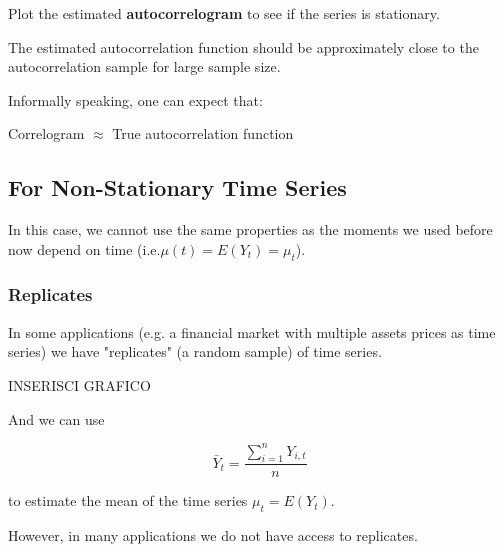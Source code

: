         Plot the estimated \textbf{autocorrelogram} to see if the series is stationary.

        \begin{figure}
        \end{figure}

        The estimated autocorrelation function should be approximately close to the autocorrelation sample for large sample size.

        \begin{proposition}
            Informally speaking, one can expect that:

            Correlogram \(\approx\) True autocorrelation function
        \end{proposition}

    \subsection{For Non-Stationary Time Series}

        In this case, we cannot use the same properties as the moments we used before now depend on time (i.e.\(\mu(t) = E(Y_t) = \mu_t\)).

        \subsubsection{Replicates}

            In some applications (e.g. a financial market with multiple assets prices as time series) we have "replicates" (a random sample) of time series.
            
            INSERISCI GRAFICO

            And we can use

            \begin{equation}
                \bar{Y}_t = \frac{\sum_{i=1}^{n}Y_{i,t}}{n}
            \end{equation}

            to estimate the mean of the time series \( \mu_t = E(Y_t) \).

            However, in many applications we do not have access to replicates.

